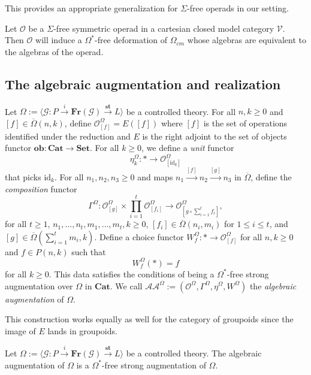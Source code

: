 \documentclass{tac}
\begin{document}
This provides an appropriate generalization for $\Sigma$-free operads in our setting.

\begin{example}
Let $\mathcal{O}$ be a $\Sigma$-free symmetric operad in a cartesian closed model category $\mathcal{V}$. Then $\mathcal{O}$ will induce a $\Omega^*$-free deformation of $\Omega_{cm}$ whose algebras are equivalent to the algebras of the operad.
\end{example}


\subsection*{The algebraic augmentation and realization}

\begin{construction}\label{constr_of_algebraic_aug}
Let $\Omega:=\langle \mathcal{G}:P\xrightarrow{i}\mathbf{Fr}(\mathcal{G})\xrightarrow{\mathbf{st}}L\rangle$ be a controlled theory. For all $n,k\geq 0$ and $[f]\in\overline{\Omega}(n,k)$, define $\mathcal{O}^\Omega_{[f]}=E([f])$ where $[f]$ is the set of operations identified under the reduction and $E$ is the right adjoint to the set of objects functor $\mathbf{ob}:\mathbf{Cat}\to\mathbf{Set}$. For all $k\geq 0$, we define a \emph{unit} functor 
\[
\eta_k^{\Omega}:*\to \mathcal{O}^\Omega_{[\text{id}_k]}
\]
that picks $\text{id}_k$. For all $n_1,n_2,n_3\geq 0$ and maps $n_1\xrightarrow{[f]}n_2\xrightarrow{[g]}n_3$ in $\overline{\Omega}$, define the \emph{composition} functor 
    \[
    \Gamma^\Omega:\mathcal{O}^\Omega_{[g]}\times\prod_{i=1}^t\mathcal{O}^\Omega_{[f_i]}\to\mathcal{O}^\Omega_{[g\circ\sum_{i=1}^tf_i]},
    \]
    for all $t\geq 1$, $n_1,\dots,n_t,m_1,\dots,m_t,k\geq 0$, $[f_i]\in\overline{\Omega}(n_i,m_i)$ for $1\leq i\leq t$, and $[g]\in\overline{\Omega}(\sum_{i=1}^tm_i,k)$. Define a choice functor $W^\Omega_f:*\to \mathcal{O}^\Omega_{[f]}$ for all $n,k\geq 0$ and $f\in P(n,k)$ such that 
    \[
    W^\Omega_{f}(*)=f
    \]
    for all $k\geq 0$.
This data satisfies the conditions of being a $\Omega^*$-free strong augmentation over $\Omega$ in $\mathbf{Cat}$. We call $\mathcal{AA}^\Omega:=(\mathcal{O}^\Omega,\Gamma^\Omega,\eta^\Omega,W^\Omega)$ the \emph{algebraic augmentation} of $\Omega$.
 \end{construction}

 This construction works equally as well for the category of groupoids since the image of $E$ lands in groupoids.

 \begin{theorem}\label{proof_of_freeness_of_alg_aug}
Let $\Omega:=\langle \mathcal{G}:P\xrightarrow{i}\mathbf{Fr}(\mathcal{G})\xrightarrow{\mathbf{st}}L\rangle$ be a controlled theory. The algebraic augmentation of $\Omega$ is a $\Omega^*$-free strong augmentation of $\Omega$.
 \end{theorem}
\end{document}
